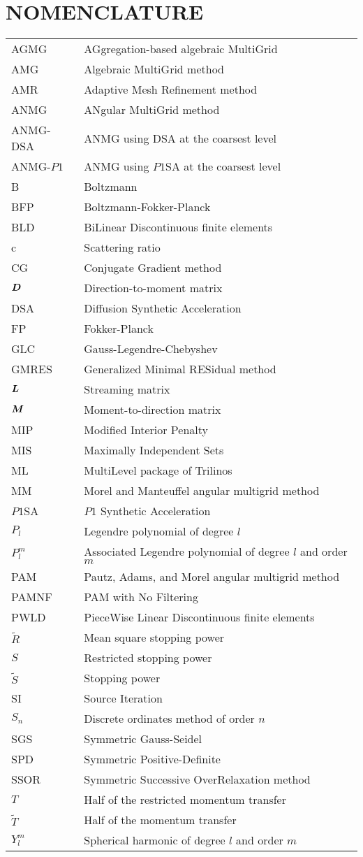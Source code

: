 \chapter*{NOMENCLATURE}

\begin{xtabular}{ll}
      AGMG & AGgregation-based algebraic MultiGrid \tabularnewline
       AMG & Algebraic MultiGrid method \tabularnewline
       AMR & Adaptive Mesh Refinement method \tabularnewline
      ANMG & ANgular MultiGrid method \tabularnewline
  ANMG-DSA & ANMG using DSA at the coarsest level \tabularnewline
 ANMG-$P1$ & ANMG using $P1$SA at the coarsest level \tabularnewline
         B & Boltzmann \tabularnewline
       BFP & Boltzmann-Fokker-Planck \tabularnewline
       BLD & BiLinear Discontinuous finite elements \tabularnewline
         c & Scattering ratio \tabularnewline
        CG & Conjugate Gradient method \tabularnewline
  $\boldsymbol{D}$ & Direction-to-moment matrix \tabularnewline
       DSA & Diffusion Synthetic Acceleration \tabularnewline
        FP & Fokker-Planck \tabularnewline
       GLC & Gauss-Legendre-Chebyshev \tabularnewline
     GMRES & Generalized Minimal RESidual method \tabularnewline
  $\boldsymbol{L}$ & Streaming matrix \tabularnewline
  $\boldsymbol{M}$ & Moment-to-direction matrix \tabularnewline
       MIP & Modified Interior Penalty \tabularnewline
       MIS & Maximally Independent Sets \tabularnewline
        ML & MultiLevel package of Trilinos \tabularnewline
        MM & Morel and Manteuffel angular multigrid method \tabularnewline
    $P1$SA & $P1$ Synthetic Acceleration \tabularnewline
     $P_l$ & Legendre polynomial of degree $l$ \tabularnewline
   $P_l^m$ & Associated Legendre polynomial of degree $l$ and order $m$
  \tabularnewline
       PAM & Pautz, Adams, and Morel angular multigrid method \tabularnewline
     PAMNF & PAM with No Filtering \tabularnewline
      PWLD & PieceWise Linear Discontinuous finite elements \tabularnewline
$\tilde{R}$ & Mean square stopping power \tabularnewline
       $S$ & Restricted stopping power \tabularnewline
$\tilde{S}$ & Stopping power \tabularnewline
        SI & Source Iteration \tabularnewline
     $S_n$ & Discrete ordinates method of order $n$ \tabularnewline
     SGS   & Symmetric Gauss-Seidel \tabularnewline
       SPD & Symmetric Positive-Definite \tabularnewline
      SSOR & Symmetric Successive OverRelaxation method \tabularnewline
       $T$ & Half of the restricted momentum transfer \tabularnewline
$\tilde{T}$ & Half of the momentum transfer \tabularnewline
   $Y_l^m$ & Spherical harmonic of degree $l$ and order $m$ \tabularnewline 

\end{xtabular}
